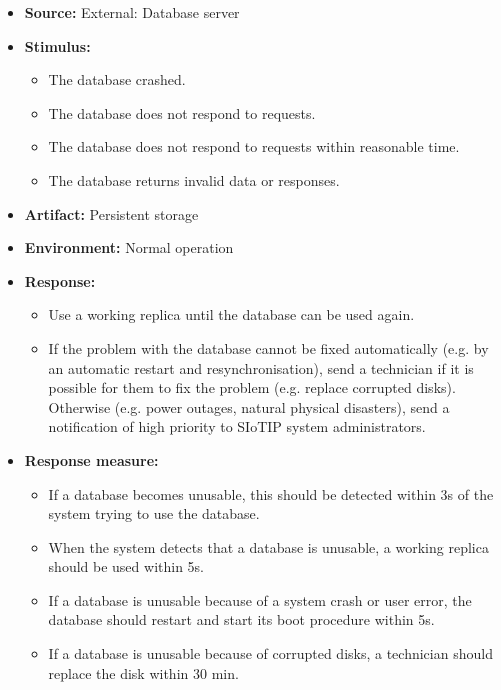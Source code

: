 \documentclass[english]{sareport}
\begin{document}
\begin{itemize}
    \item \textbf{Source:} External: Database server
    \item \textbf{Stimulus:}
        \begin{itemize}
            \item The database crashed.
            \item The database does not respond to requests.
            \item The database does not respond to requests within reasonable time.
            \item The database returns invalid data or responses.
        \end{itemize}

    \item \textbf{Artifact:} Persistent storage
    \item \textbf{Environment:} Normal operation
    \item \textbf{Response:}
        \begin{itemize}
            \item Use a working replica until the database can be used again.
            \item If the problem with the database cannot be fixed automatically
                  (e.g. by an automatic restart and resynchronisation), send
                  a technician if it is possible for them to fix the problem
                  (e.g. replace corrupted disks). Otherwise (e.g. power outages,
                  natural physical disasters), send a notification
                  of high priority to SIoTIP system administrators.
        \end{itemize}

    \item \textbf{Response measure:}
        \begin{itemize}
            \item If a database becomes unusable, this should be detected
                  within 3s of the system trying to use the database.
            \item When the system detects that a database is unusable,
                  a working replica should be used within 5s.
            \item If a database is unusable because of a system crash or user error,
                  the database should restart and start its boot procedure within 5s.
            \item If a database is unusable because of corrupted disks, a technician
                  should replace the disk within 30 min.
        \end{itemize}
\end{itemize}
\end{document}
